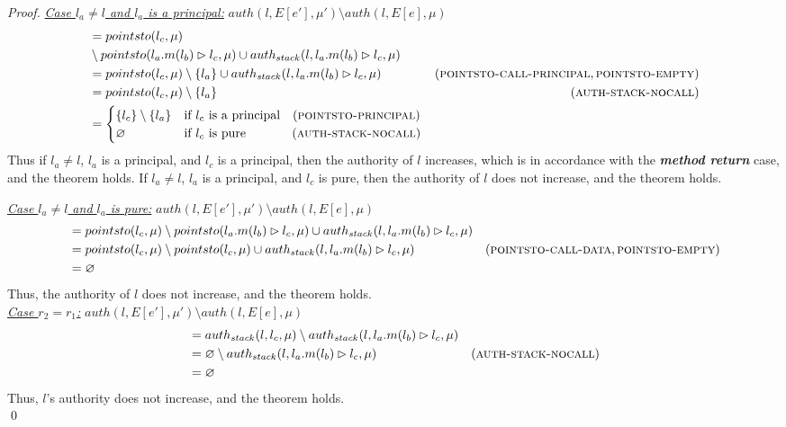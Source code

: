 \documentclass{llncs}
\begin{document}
\begin{proof}
\noindent\underline{\textit{Case $l_a \neq l$ and $l_a$ is a principal:}}
\noindent$auth(l, E[e'], \mu') \setminus auth(l, E[e], \mu)$
\vspace{-7pt}
\begin{align*}
&= pointsto(l_c, \mu)\\
& \setminus pointsto(l_a.m(l_b) \rhd l_c, \mu) \cup auth_{stack}(l, l_a.m(l_b) \rhd l_c, \mu)\\
&= pointsto(l_c, \mu) \setminus \{ l_a \} \cup auth_{stack}(l, l_a.m(l_b) \rhd l_c, \mu) & (\textsc{pointsto-call-principal}, \textsc{pointsto-empty})\\
&= pointsto(l_c, \mu) \setminus \{ l_a \} & (\textsc{auth-stack-nocall})\\
&=
\begin{cases}
    \{ l_c \} \setminus \{ l_a \} & \text{if } l_c \text{ is a principal}~~~(\textsc{pointsto-principal})\\
    \varnothing & \text{if } l_c \text{ is pure}~~~~~~~~~~~(\textsc{auth-stack-nocall})
\end{cases}
\end{align*}
Thus if $l_a \neq l$, $l_a$ is a principal, and $l_c$ is a principal, then the authority of $l$ increases, which is in accordance with the \textbf{\textit{method return}} case, and the theorem holds. If $l_a \neq l$, $l_a$ is a principal, and $l_c$ is pure, then the authority of $l$ does not increase, and the theorem holds.

\noindent\underline{\textit{Case $l_a \neq l$ and $l_a$ is pure:}}
\noindent$auth(l, E[e'], \mu') \setminus auth(l, E[e], \mu)$
\vspace{-7pt}
\begin{align*}
&= pointsto(l_c, \mu) \setminus pointsto(l_a.m(l_b) \rhd l_c, \mu) \cup auth_{stack}(l, l_a.m(l_b) \rhd l_c, \mu)\\
&= pointsto(l_c, \mu) \setminus pointsto(l_c, \mu) \cup auth_{stack}(l, l_a.m(l_b) \rhd l_c, \mu) & (\textsc{pointsto-call-data}, \textsc{pointsto-empty})\\
&= \varnothing
\end{align*}
Thus, the authority of $l$ does not increase, and the theorem holds.\\

\noindent\underline{\underline{\textit{Case $r_2 = r_1$:}}}
$auth(l, E[e'], \mu') \setminus auth(l, E[e], \mu)$
\vspace{-7pt}
\begin{align*}
&= auth_{stack}(l, l_c, \mu) \setminus auth_{stack}(l, l_a.m(l_b) \rhd l_c, \mu)\\
&= \varnothing \setminus auth_{stack}(l, l_a.m(l_b) \rhd l_c, \mu) & (\textsc{auth-stack-nocall})\\
&= \varnothing
\end{align*}
Thus, $l$'s authority does not increase, and the theorem holds.\\
\qed
\end{proof}
\end{document}
